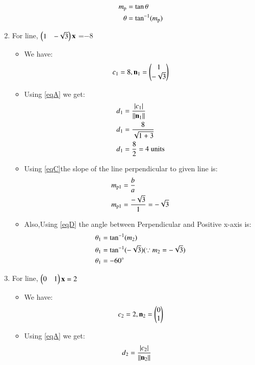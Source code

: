 \documentclass[journal,12pt,twocolumn]{IEEEtran}
\begin{document}
\begin{enumerate}
\begin{itemize}
\begin{align}
  m\textsubscript{p}&=\tan \theta
  \\
  \theta &= \tan^{-1}( m\textsubscript{p})\label{eqD}
\end{align}
\end{itemize}
\item For line, $\begin{pmatrix}1&-\sqrt{3}\end{pmatrix}\mathbf{x}$ =$-8$
\begin{itemize}
\item We have:
\begin{align}
 c\textsubscript{1}=8 , {\mathbf{n\textsubscript{1}}}=\begin{pmatrix}1\\-\sqrt{3}\end{pmatrix}   
\end{align}
\item Using \eqref{eqA} we get:
\begin{align}
d\textsubscript{1}&=\frac { \left| c\textsubscript{1} \right| }{\lVert\mathbf{n\textsubscript{1}}\rVert}
\\
d\textsubscript{1}&=\frac{8}{\sqrt{1+3}} 
\\
d\textsubscript{1}&=\frac{8}{2}=4\text{ units}
\end{align}
\item Using \eqref{eqC}the slope of the line perpendicular to given line is:
\begin{align}
  m\textsubscript{p1}&=\frac{b}{a}
  \\
  m\textsubscript{p1}&=\frac{-\sqrt{3}}{1}=-\sqrt{3}
\end{align}
 \item Also,Using \eqref{eqD} the angle between Perpendicular and Positive x-axis is:
 \begin{align}
  \theta\textsubscript{1} &= \tan^{-1}( m\textsubscript{2})
  \\
 \theta\textsubscript{1} &= \tan^{-1}(-\sqrt{3}) (\because m\textsubscript{2}=-\sqrt{3})
 \\
 \theta\textsubscript{1} &= -60\degree
\end{align}
\end{itemize}
\item For line, $\begin{pmatrix}0&1\end{pmatrix}\mathbf{x} =2$
\begin{itemize}
\item We have:
\begin{align}
 c\textsubscript{2}=2 ,{\mathbf{n\textsubscript{2}}}=\begin{pmatrix}0\\1\end{pmatrix}   
\end{align}
\item Using \eqref{eqA} we get:
\begin{align}
d\textsubscript{2}&=\frac { \left| c\textsubscript{2} \right| }{\norm{\vec{n\textsubscript{2}}}}

\end{align}
\end{itemize}
\end{enumerate}
\end{document}
